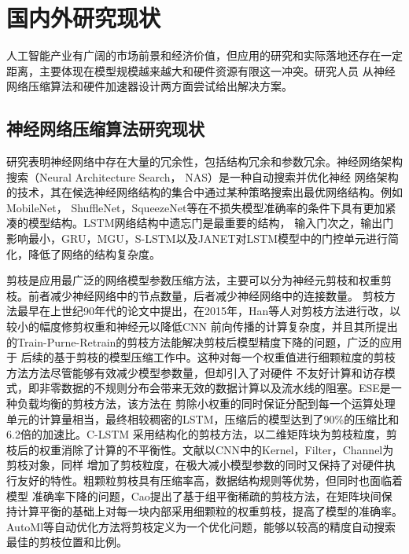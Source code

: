

\section{国内外研究现状}
人工智能产业有广阔的市场前景和经济价值，但应用的研究和实际落地还存在一定距离，主要体现在模型规模越来越大和硬件资源有限这一冲突。研究人员
从神经网络压缩算法和硬件加速器设计两方面尝试给出解决方案。

\subsection{神经网络压缩算法研究现状}
研究表明神经网络中存在大量的冗余性，包括结构冗余和参数冗余。神经网络架构搜索（Neural Architecture Search， NAS）是一种自动搜索并优化神经
网络架构的技术，其在候选神经网络结构的集合中通过某种策略搜索出最优网络结构。例如MobileNet，
ShuffleNet，SqueezeNet\citing{}等在不损失模型准确率的条件下具有更加紧凑的模型结构。LSTM网络结构中遗忘门是最重要的结构，
输入门次之，输出门影响最小，GRU，MGU，S-LSTM以及JANET对LSTM模型中的门控单元进行简化，降低了网络的结构复杂度。

剪枝是应用最广泛的网络模型参数压缩方法，主要可以分为神经元剪枝和权重剪枝。前者减少神经网络中的节点数量，后者减少神经网络中的连接数量。
剪枝方法最早在上世纪90年代的论文中提出，在2015年，Han等人对剪枝方法进行改，以较小的幅度修剪权重和神经元以降低CNN
前向传播的计算复杂度，并且其所提出的Train-Purne-Retrain的剪枝方法能解决剪枝后模型精度下降的问题，广泛的应用于
后续的基于剪枝的模型压缩工作中。这种对每一个权重值进行细颗粒度的剪枝方法方法尽管能够有效减少模型参数量，但却引入了对硬件
不友好计算和访存模式，即非零数据的不规则分布会带来无效的数据计算以及流水线的阻塞。ESE是一种负载均衡的剪枝方法，该方法在
剪除小权重的同时保证分配到每一个运算处理单元的计算量相当，最终相较稠密的LSTM，压缩后的模型达到了90\%的压缩比和6.2倍的加速比。C-LSTM
采用结构化的剪枝方法，以二维矩阵块为剪枝粒度，剪枝后的权重消除了计算的不平衡性。文献以CNN中的Kernel，Filter，Channel为剪枝对象，同样
增加了剪枝粒度，在极大减小模型参数的同时又保持了对硬件执行友好的特性。粗颗粒剪枝具有压缩率高，数据结构规则等优势，但同时也面临着模型
准确率下降的问题，Cao提出了基于组平衡稀疏的剪枝方法，在矩阵块间保持计算平衡的基础上对每一块内部采用细颗粒的权重剪枝，提高了模型的准确率。
AutoMl等自动优化方法将剪枝定义为一个优化问题，能够以较高的精度自动搜索最佳的剪枝位置和比例。

